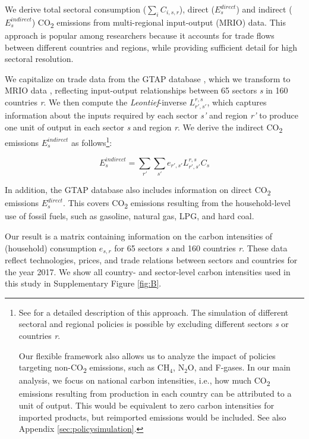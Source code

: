 \documentclass[12pt, a4paper]{article}
\begin{document}
We derive total sectoral consumption ($\sum_{i} C_{i,s,r}$), direct ($E_{s}^{direct}$) and indirect ($E_{s}^{indirect}$) CO\textsubscript{2} emissions from  multi-regional input-output (MRIO) data. This approach is popular among researchers because it accounts for trade flows between different countries and regions, while providing sufficient detail for high sectoral resolution. 

We capitalize on trade data from the GTAP database \autocite[Version 11B, ][]{Aguiar.2022}, which we transform to MRIO data \autocite{Peters.2011}, reflecting input-output relationships between 65 sectors \textit{s} in 160 countries \textit{r}. We then compute the \textit{Leontief}-inverse $L_{r',s'}^{r,s}$, which captures information about the inputs required by each sector \textit{s'} and region \textit{r'} to produce one unit of output in each sector \textit{s} and region \textit{r}. We derive the indirect CO\textsubscript{2} emissions $E_{s}^{indirect}$ as follows\footnote{See \textcite{Missbach.2024, Steckel.2021b,Feindt.2021,VogtSchilb.2019} for a detailed description of this approach. The simulation of different sectoral and regional policies is possible by excluding different sectors \textit{s} or countries \textit{r}. 

Our flexible framework also allows us to analyze the impact of policies targeting non-CO\textsubscript{2} emissions, such as CH$_{4}$, N$_{2}$O, and F-gases. In our main analysis, we focus on national carbon intensities, i.e., how much CO\textsubscript{2} emissions resulting from production in each country can be attributed to a unit of output. This would be equivalent to zero carbon intensities for imported products, but reimported emissions would be included. See also Appendix \ref{sec:policysimulation}.}:

\begin{equation}
    E_{s}^{indirect} = \sum_{r'} \sum_{s'} e_{r',s'} L_{r',s'}^{r,s} C_{s}
\end{equation}

In addition, the GTAP database also includes information on direct CO\textsubscript{2} emissions $E_{s}^{direct}$. This covers CO\textsubscript{2} emissions resulting from the household-level use of fossil fuels, such as gasoline, natural gas, LPG, and hard coal.

Our result is a matrix containing information on the carbon intensities of (household) consumption $e_{s,r}$ for 65 sectors \textit{s} and 160 countries \textit{r}. These data reflect technologies, prices, and trade relations between sectors and countries for the year 2017. We show all country- and sector-level carbon intensities used in this study in Supplementary Figure \ref{fig:B}.
\end{document}

